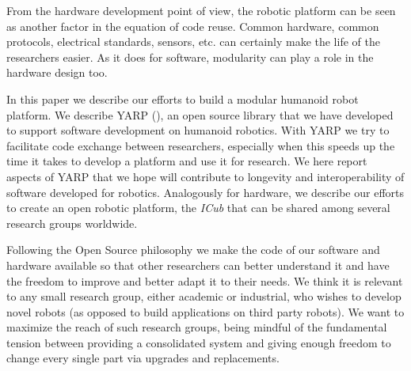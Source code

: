 %
From the hardware development point of view, the robotic platform can 
be seen as another factor in the
equation of code reuse. Common hardware, common protocols,
electrical standards, sensors, etc. can certainly make the 
life of the researchers easier. As it does for software, modularity 
can play a role in the hardware design too. 

In this paper we describe our efforts to build a modular
humanoid robot platform. We 
describe YARP (\cite{metta2006yarp}), an open source library 
that we have developed to support software development on humanoid 
robotics. With YARP we try to facilitate code exchange between researchers, 
especially when this speeds up the time 
it takes to develop a platform and use it for research. We here report 
aspects of YARP that we hope will contribute to longevity and 
interoperability of software developed for robotics. Analogously for
hardware, we describe our efforts to create an open 
robotic platform, the \emph{ICub} that can be shared among several research 
groups worldwide.

Following the Open Source philosophy we make the 
code of our software and hardware available so that other 
researchers can better understand it and have the freedom 
to improve and better adapt it to their needs.
%
%
%
We think it is relevant to any small research group, either academic or
industrial, who wishes to develop novel robots (as opposed to 
build applications on third party robots).  We want to maximize the 
reach of such research groups, being mindful of the fundamental tension 
between providing a consolidated system and giving enough freedom
to change every single part via upgrades and replacements. 
%




